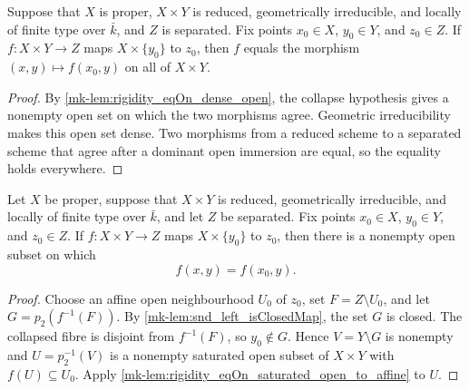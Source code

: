 \begin{lemma}
  \label{mk-lem:rigidity_core}
  \leanok

  Suppose that \(X\) is proper, \(X\times Y\) is reduced, geometrically irreducible,
  and locally of finite type over \(\bar k\), and \(Z\) is separated.  Fix points
  \(x_0\in X\), \(y_0\in Y\), and \(z_0\in Z\).  If
  \(f\colon X\times Y\to Z\) maps \(X\times\{y_0\}\) to \(z_0\), then \(f\)
  equals the morphism \((x,y)\mapsto f(x_0,y)\) on all of \(X\times Y\).
\end{lemma}
\begin{proof}
  \leanok
  By \ref{mk-lem:rigidity_eqOn_dense_open}, the collapse hypothesis gives a nonempty
  open set on which the two morphisms agree.  Geometric irreducibility makes this open
  set dense.  Two morphisms from a reduced scheme to a separated scheme that agree
  after a dominant open immersion are equal, so the equality holds everywhere.
\end{proof}

\begin{lemma}
  \label{mk-lem:rigidity_eqOn_dense_open}
  \leanok

  Let \(X\) be proper, suppose that \(X\times Y\) is reduced, geometrically
  irreducible, and locally of finite type over \(\bar k\), and let \(Z\) be separated.
  Fix points \(x_0\in X\), \(y_0\in Y\), and \(z_0\in Z\).  If
  \(f\colon X\times Y\to Z\) maps \(X\times\{y_0\}\) to \(z_0\), then there is a
  nonempty open subset on which
  \[
    f(x,y)=f(x_0,y).
  \]
\end{lemma}
\begin{proof}
  \leanok
  Choose an affine open neighbourhood \(U_0\) of \(z_0\), set
  \(F=Z\setminus U_0\), and let \(G=p_2(f^{-1}(F))\).  By
  \ref{mk-lem:snd_left_isClosedMap}, the set \(G\) is closed.  The collapsed fibre is
  disjoint from \(f^{-1}(F)\), so \(y_0\notin G\).  Hence
  \(V=Y\setminus G\) is nonempty and \(U=p_2^{-1}(V)\) is a nonempty saturated
  open subset of \(X\times Y\) with \(f(U)\subseteq U_0\).  Apply
  \ref{mk-lem:rigidity_eqOn_saturated_open_to_affine} to \(U\).
\end{proof}

